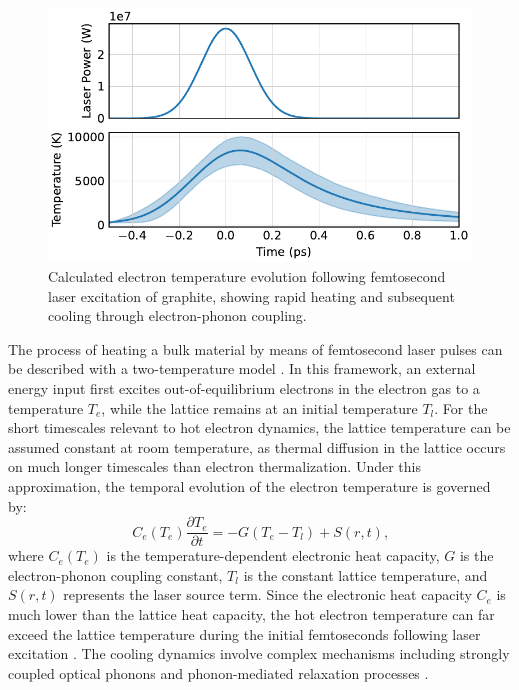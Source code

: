 \documentclass[
	parskip=half,
	a4paper,
]{scrarticle}
\begin{document}
\begin{figure}
    \centering
    \includegraphics{../analysis/figures/model te.pdf}
    \caption{Calculated electron temperature evolution following femtosecond laser excitation of graphite, showing rapid heating and subsequent cooling through electron-phonon coupling.}
    \label{fig:temperature}
\end{figure}
The process of heating a bulk material by means of femtosecond laser pulses can be described with a two-temperature model \cite{roob_thermal_2025}. In this framework, an external energy input first excites out-of-equilibrium electrons in the electron gas to a temperature $T_e$, while the lattice remains at an initial temperature $T_l$. For the short timescales relevant to hot electron dynamics, the lattice temperature can be assumed constant at room temperature, as thermal diffusion in the lattice occurs on much longer timescales than electron thermalization. Under this approximation, the temporal evolution of the electron temperature is governed by:
\begin{equation}
C_e(T_e) \frac{\partial T_e}{\partial t} = -G(T_e - T_l) + S(r,t)\text{,}
\end{equation}
where $C_e(T_e)$ is the temperature-dependent electronic heat capacity, $G$ is the electron-phonon coupling constant, $T_l$ is the constant lattice temperature, and $S(r,t)$ represents the laser source term. Since the electronic heat capacity $C_e$ is much lower than the lattice heat capacity, the hot electron temperature can far exceed the lattice temperature during the initial femtoseconds following laser excitation \cite{nihira_temperature_2003}. The cooling dynamics involve complex mechanisms including strongly coupled optical phonons \cite{kampfrath_strongly_2005} and phonon-mediated relaxation processes \cite{stange_hot_2015}.
\end{document}

